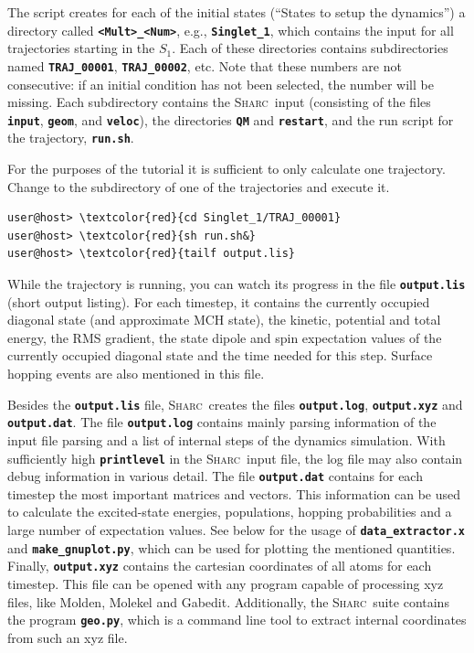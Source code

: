 \documentclass[a4paper,11pt,DIV=15,openany]{scrbook}
\newcommand{\sharc}{\textsc{Sharc}}
\newcommand{\ttt}[1]{\textbf{\texttt{#1}}}
\begin{document}
The script creates for each of the initial states (``States to setup the dynamics'') a directory called \ttt{<Mult>\_<Num>}, e.g., \ttt{Singlet\_1}, which contains the input for all trajectories starting in the $S_1$. 
Each of these directories contains subdirectories named \ttt{TRAJ\_00001}, \ttt{TRAJ\_00002}, etc. Note that these numbers are not consecutive: if an initial condition has not been selected, the number will be missing.
Each subdirectory contains the \sharc\ input (consisting of the files \ttt{input}, \ttt{geom}, and \ttt{veloc}), the directories \ttt{QM} and \ttt{restart}, and the run script for the trajectory, \ttt{run.sh}.

For the purposes of the tutorial it is sufficient to only calculate one trajectory. Change to the subdirectory of one of the trajectories and execute it.
\begin{Verbatim}[commandchars=\\\{\}]
user@host> \textcolor{red}{cd Singlet_1/TRAJ_00001}
user@host> \textcolor{red}{sh run.sh&}
user@host> \textcolor{red}{tailf output.lis}
\end{Verbatim}
While the trajectory is running, you can watch its progress in the file \ttt{output.lis} (short output listing). For each timestep, it contains the currently occupied diagonal state (and approximate MCH state), the kinetic, potential and total energy, the RMS gradient, the state dipole and spin expectation values of the currently occupied diagonal state and the time needed for this step. Surface hopping events are also mentioned in this file.

Besides the \ttt{output.lis} file, \sharc\ creates the files \ttt{output.log}, \ttt{output.xyz} and \ttt{output.dat}. The file
\ttt{output.log} contains mainly parsing information of the input file parsing and a list of internal steps of the dynamics simulation. With sufficiently high \ttt{printlevel} in the \sharc\ input file, the log file may also contain debug information in various detail.
The file \ttt{output.dat} contains for each timestep the most important matrices and vectors. This information can be used to calculate the excited-state energies, populations, hopping probabilities and a large number of expectation values. See below for the usage of \ttt{data\_extractor.x} and \ttt{make\_gnuplot.py}, which can be used for plotting the mentioned quantities.
Finally, \ttt{output.xyz} contains the cartesian coordinates of all atoms for each timestep. This file can be opened with any program capable of processing xyz files, like Molden, Molekel and Gabedit. Additionally, the \sharc\ suite contains the program \ttt{geo.py}, which is a command line tool to extract internal coordinates from such an xyz file.
\end{document}
